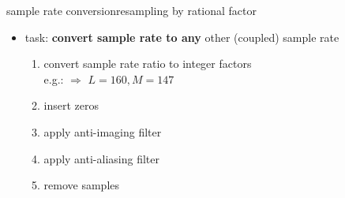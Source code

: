 	\begin{frame}{sample rate conversion}{resampling by rational factor}
        \begin{itemize}
            \item   task: \textbf{convert sample rate to any} other (coupled) sample rate
            \pause 
            \begin{enumerate}
                \item   convert sample rate ratio to integer factors\\ e.g.:   $\Rightarrow$ $L=160, M=147$
                \pause
                \item   insert zeros
                \item   apply anti-imaging filter
                \pause
                \item   apply anti-aliasing filter
                \item   remove samples
            \end{enumerate}
        \end{itemize}
        \bigskip
        \vspace{50mm}
    \end{frame}
